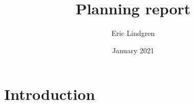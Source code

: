 \documentclass{article}
\title{Planning report}
\author{Eric Lindgren}
\date{January 2021}
\begin{document}
\maketitle

\section{Introduction}
\end{document}
